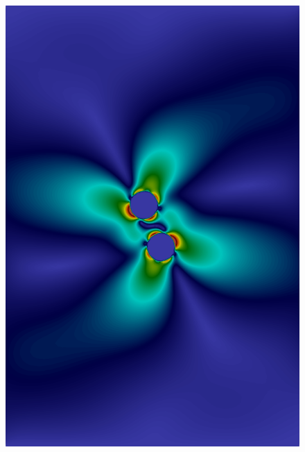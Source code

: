 \documentclass[graybox]{svmult}
\begin{document}
\begin{figure}
	\includegraphics[scale=0.14]{Figures/squirmer/t=2.5.png}

\end{figure}
\end{document}
